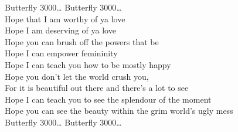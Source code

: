 Butterfly 3000… Butterfly 3000… \\

Hope that I am worthy of ya love \\
Hope I am deserving of ya love \\
Hope you can brush off the powers that be \\
Hope I can empower femininity \\
Hope I can teach you how to be mostly happy \\
Hope you don't let the world crush you, \\
For it is beautiful out there and there's a lot to see \\
Hope I can teach you to see the splendour of the moment \\
Hope you can see the beauty within the grim world's ugly mess \\

Butterfly 3000… Butterfly 3000… \\
